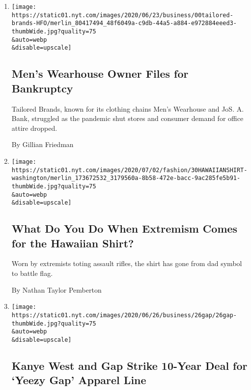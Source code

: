\begin{enumerate}
\def\labelenumi{\arabic{enumi}.}
\item
  \href{/2020/08/03/business/tailored-brands-mens-wearhouse-bankruptcy.html}{}

  \texttt{[image: https://static01.nyt.com/images/2020/06/23/business/00tailored-brands-HFO/merlin\_80417494\_48f6049a-c9db-44a5-a884-e972884eeed3-thumbWide.jpg?quality=75\\\&auto=webp\\\&disable=upscale]}

  \hypertarget{mens-wearhouse-owner-files-for-bankruptcy}{%
  \subsection{Men's Wearhouse Owner Files for
  Bankruptcy}\label{mens-wearhouse-owner-files-for-bankruptcy}}

  Tailored Brands, known for its clothing chains Men's Wearhouse and
  JoS. A. Bank, struggled as the pandemic shut stores and consumer
  demand for office attire dropped.

  By Gillian Friedman
\item
  \href{/2020/06/29/style/boogaloo-hawaiian-shirt.html}{}

  \texttt{[image: https://static01.nyt.com/images/2020/07/02/fashion/30HAWAIIANSHIRT-washington/merlin\_173672532\_3179560a-8b58-472e-bacc-9ac285fe5b91-thumbWide.jpg?quality=75\\\&auto=webp\\\&disable=upscale]}

  \hypertarget{what-do-you-do-when-extremism-comes-for-the-hawaiian-shirt}{%
  \subsection{What Do You Do When Extremism Comes for the Hawaiian
  Shirt?}\label{what-do-you-do-when-extremism-comes-for-the-hawaiian-shirt}}

  Worn by extremists toting assault rifles, the shirt has gone from dad
  symbol to battle flag.

  By Nathan Taylor Pemberton
\item
  \href{/2020/06/26/business/kanye-west-yeezy-gap.html}{}

  \texttt{[image: https://static01.nyt.com/images/2020/06/26/business/26gap/26gap-thumbWide.jpg?quality=75\\\&auto=webp\\\&disable=upscale]}

  \hypertarget{kanye-west-and-gap-strike-10-year-deal-for-yeezy-gap-apparel-line}{%
  \subsection{Kanye West and Gap Strike 10-Year Deal for `Yeezy Gap'
  Apparel
  Line}\label{kanye-west-and-gap-strike-10-year-deal-for-yeezy-gap-apparel-line}}


\end{enumerate}
